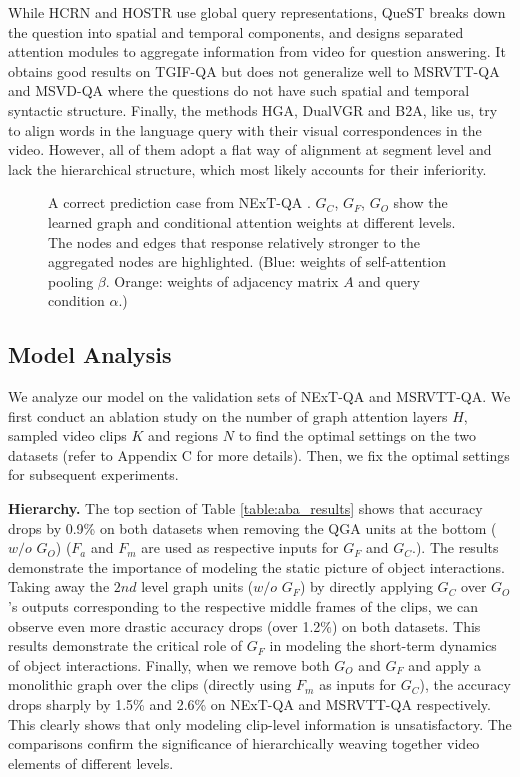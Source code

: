\documentclass[letterpaper]{article} \usepackage{aaai21}  \usepackage{times}  \usepackage{helvet} \usepackage{courier}  \usepackage[hyphens]{url}  \usepackage{graphicx} \urlstyle{rm} \def\UrlFont{\rm}  \usepackage{natbib}  \usepackage{caption} \usepackage{color, colortbl}
\begin{document}
While HCRN and HOSTR use global query representations, QueST breaks down the question into spatial and temporal components, and designs separated attention modules to aggregate information from video for question answering. It obtains good results on TGIF-QA but does not generalize well to MSRVTT-QA and MSVD-QA where the questions do not have such spatial and temporal syntactic structure. Finally, the methods HGA, DualVGR and B2A, like us, try to align words in the language query with their visual correspondences in the video. However, all of them adopt a flat way of alignment at segment level and lack the hierarchical structure, which most likely accounts for their inferiority.

\begin{figure*}[t]
 \centering
 \caption{A correct prediction case from NExT-QA \cite{xiao2021next}. $G_C$, $G_F$, $G_O$ show the learned graph and conditional attention weights at different levels. The nodes and edges that response relatively stronger to the aggregated nodes are highlighted. (Blue: weights of self-attention pooling $\beta$. Orange: weights of adjacency matrix $A$ and query condition $\alpha$.)}
 \label{fig:qual_result}
\vspace{-.5em}
 \end{figure*}


\subsection{Model Analysis}
We analyze our model on the validation sets of NExT-QA and MSRVTT-QA. We first conduct an ablation study on the number of graph attention layers $H$, sampled video clips $K$ and regions $N$ to find the optimal settings on the two datasets (refer to Appendix C for more details). Then, we fix the optimal settings for subsequent experiments. 



\textbf{Hierarchy.} The top section of Table \ref{table:aba_results} shows that accuracy drops by 0.9\% on both datasets when removing the QGA units at the bottom ($w/o$ $G_O$) ($F_a$ and $F_m$ are used as respective inputs for $G_F$ and $G_C$.). The results demonstrate the importance of modeling the static picture of object interactions. Taking away the $2nd$ level graph units ($w/o$ $G_F$) by directly applying $G_C$ over $G_O$'s outputs corresponding to the respective middle frames of the clips, we can observe even more drastic accuracy drops (over 1.2\%) on both datasets. This results demonstrate the critical role of $G_F$ in modeling the short-term dynamics of object interactions. Finally, when we remove both $G_O$ and $G_F$ and apply a monolithic graph over the clips (directly using $F_m$ as inputs for $G_C$), the accuracy drops sharply by 1.5\% and 2.6\% on NExT-QA and MSRVTT-QA respectively. This clearly shows that only modeling clip-level information is unsatisfactory. The comparisons confirm the significance of hierarchically weaving together video elements of different levels.
\end{document}
